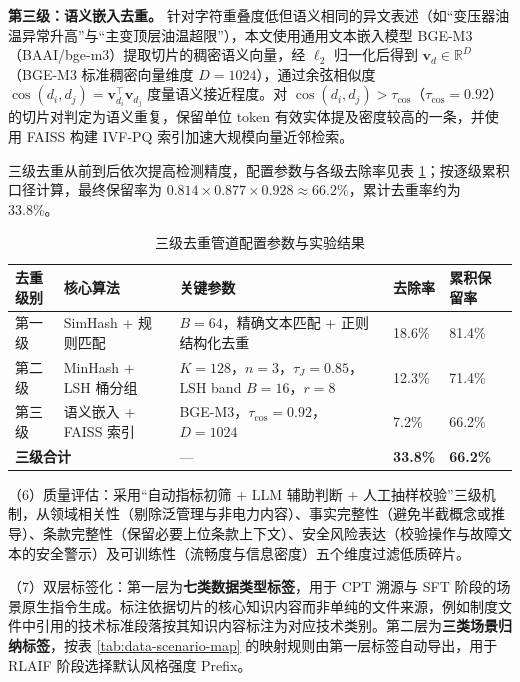 \documentclass[fontset=fandol,type=master,campus=shenzhen,etitleauto=true]{hithesisbook}
\begin{document}
\textbf{第三级：语义嵌入去重。} 针对字符重叠度低但语义相同的异文表述（如``变压器油温异常升高''与``主变顶层油温超限''），本文使用通用文本嵌入模型 BGE-M3（BAAI/bge-m3）提取切片的稠密语义向量，经 $\ell_2$ 归一化后得到 $\mathbf{v}_d \in \mathbb{R}^{D}$（BGE-M3 标准稠密向量维度 $D = 1024$），通过余弦相似度 $\cos(d_i, d_j) = \mathbf{v}_{d_i}^{\top} \mathbf{v}_{d_j}$ 度量语义接近程度。对 $\cos(d_i, d_j) > \tau_{\cos}$（$\tau_{\cos} = 0.92$）的切片对判定为语义重复，保留单位 token 有效实体提及密度较高的一条，并使用 FAISS 构建 IVF-PQ 索引加速大规模向量近邻检索\cite{ref63}。

三级去重从前到后依次提高检测精度，配置参数与各级去除率见表 \ref{tab:dedup-pipeline}；按逐级累积口径计算，最终保留率为 $0.814 \times 0.877 \times 0.928 \approx 66.2\%$，累计去重率约为 33.8\%。

\begin{table}[htbp]
\centering
\caption{三级去重管道配置参数与实验结果}
\label{tab:dedup-pipeline}
\small
\setlength{\tabcolsep}{4pt}
\begin{tabular}{p{2.0cm}p{3.4cm}p{4.4cm}p{1.9cm}p{1.9cm}}
\toprule
\textbf{去重级别} & \textbf{核心算法} & \textbf{关键参数} & \textbf{去除率} & \textbf{累积保留率} \\
\midrule
第一级 & SimHash + 规则匹配 & $B = 64$，精确文本匹配 + 正则结构化去重 & 18.6\% & 81.4\% \\
\midrule
第二级 & MinHash + LSH 桶分组 & $K = 128$，$n = 3$，$\tau_J = 0.85$，LSH band $B = 16$，$r = 8$ & 12.3\% & 71.4\% \\
\midrule
第三级 & 语义嵌入 + FAISS 索引 & BGE-M3，$\tau_{\cos} = 0.92$，$D = 1024$ & 7.2\% & 66.2\% \\
\midrule
\multicolumn{2}{l}{\textbf{三级合计}} & --- & \textbf{33.8\%} & \textbf{66.2\%} \\
\bottomrule
\end{tabular}
\end{table}

\noindent （6）质量评估：采用``自动指标初筛 + LLM 辅助判断 + 人工抽样校验''三级机制，从领域相关性（剔除泛管理与非电力内容）、事实完整性（避免半截概念或推导）、条款完整性（保留必要上位条款上下文）、安全风险表达（校验操作与故障文本的安全警示）及可训练性（流畅度与信息密度）五个维度过滤低质碎片。

\noindent （7）双层标签化：第一层为\textbf{七类数据类型标签}，用于 CPT 溯源与 SFT 阶段的场景原生指令生成。标注依据切片的核心知识内容而非单纯的文件来源，例如制度文件中引用的技术标准段落按其知识内容标注为对应技术类别。第二层为\textbf{三类场景归纳标签}，按表 \ref{tab:data-scenario-map} 的映射规则由第一层标签自动导出，用于 RLAIF 阶段选择默认风格强度 Prefix。
\end{document}

